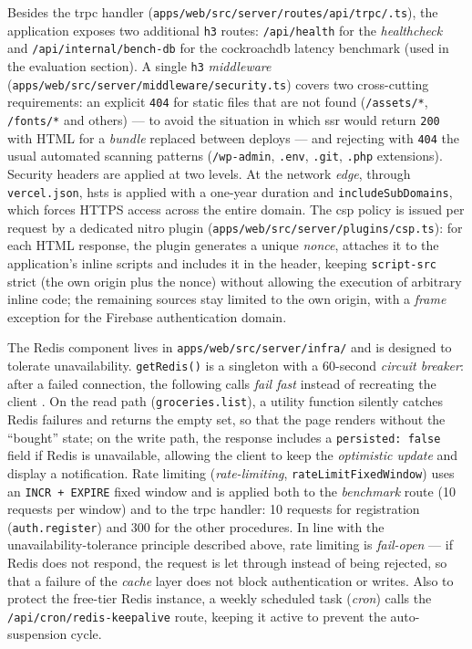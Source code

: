 Besides the \gls{trpc} handler (\texttt{apps/\allowbreak web/\allowbreak src/\allowbreak server/\allowbreak routes/\allowbreak api/\allowbreak trpc/\allowbreak [trpc].ts}), the application exposes two additional \texttt{h3} routes: \texttt{/api/health} for the \textit{healthcheck} and \texttt{/api/internal/bench-db} for the \gls{cockroachdb} latency benchmark (used in the evaluation section). A single \texttt{h3} \textit{middleware} (\texttt{apps/web/src/server/\allowbreak middleware/security.ts}) covers two cross-cutting requirements: an explicit \texttt{404} for static files that are not found (\texttt{/assets/*}, \texttt{/fonts/*} and others) --- to avoid the situation in which \acrshort{ssr} would return \texttt{200} with HTML for a \textit{bundle} replaced between deploys --- and rejecting with \texttt{404} the usual automated scanning patterns (\texttt{/wp-admin}, \texttt{.env}, \texttt{.git}, \texttt{.php} extensions). Security headers are applied at two levels. At the network \textit{edge}, through \texttt{vercel.json}, \gls{hsts} is applied with a one-year duration and \texttt{includeSubDomains}, which forces HTTPS access across the entire domain. The \gls{csp} policy is issued per request by a dedicated \gls{nitro} plugin (\texttt{apps/\allowbreak web/\allowbreak src/\allowbreak server/\allowbreak plugins/\allowbreak csp.ts}): for each HTML response, the plugin generates a unique \textit{nonce}, attaches it to the application's inline scripts and includes it in the header, keeping \texttt{script-src} strict (the own origin plus the nonce) without allowing the execution of arbitrary inline code; the remaining sources stay limited to the own origin, with a \textit{frame} exception for the Firebase authentication domain.

The Redis component lives in \texttt{apps/web/src/server/infra/} and is designed to tolerate unavailability. \texttt{getRedis()} is a singleton with a 60-second \textit{circuit breaker}: after a failed connection, the following calls \textit{fail fast} instead of recreating the client \cite{redis}. On the read path (\texttt{groceries.list}), a utility function silently catches Redis failures and returns the empty set, so that the page renders without the “bought” state; on the write path, the response includes a \texttt{persisted: false} field if Redis is unavailable, allowing the client to keep the \textit{optimistic update} and display a notification. Rate limiting (\textit{rate-limiting}, \texttt{rateLimitFixedWindow}) uses an \texttt{INCR + EXPIRE} fixed window and is applied both to the \textit{benchmark} route (10 requests per window) and to the \gls{trpc} handler: 10 requests for registration (\texttt{auth.register}) and 300 for the other procedures. In line with the unavailability-tolerance principle described above, rate limiting is \textit{fail-open} --- if Redis does not respond, the request is let through instead of being rejected, so that a failure of the \textit{cache} layer does not block authentication or writes. Also to protect the free-tier Redis instance, a weekly scheduled task (\textit{cron}) calls the \texttt{/api/cron/\allowbreak redis-keepalive} route, keeping it active to prevent the auto-suspension cycle.


